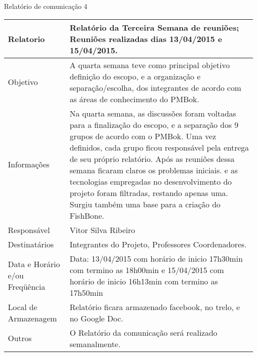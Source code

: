 \documentclass[12pt,openright,oneside,a4paper,brazil]{abntex2}
\begin{document}
\begin{center}
{\large Relatório de comunicação 4}
\begin{table}[h]
\begin{tabular}{|p{6cm}|p{9cm}|}\hline
Relatorio & Relatório da Terceira Semana de reuniões; Reuniões realizadas dias 13/04/2015 e 15/04/2015.\\ \hline
Objetivo & A quarta semana teve como principal objetivo definição do escopo, e a organização e separação/escolha, dos integrantes de acordo com as áreas de conhecimento do PMBok.\\ \hline
Informações & Na quarta semana, as discussões foram voltadas para a finalização do escopo, e a separação dos 9 grupos de acordo com o PMBok. Uma vez definidos, cada grupo ficou responsável pela entrega de seu próprio relatório.
Após as reuniões dessa semana ficaram claros os problemas iniciais. e as tecnologias empregadas no desenvolvimento do projeto foram filtradas, restando apenas uma.
Surgiu também uma base para a criação do FishBone.\\ \hline
Responsável & Vitor Silva Ribeiro\\ \hline
Destinatários & Integrantes do Projeto, Professores Coordenadores.\\ \hline
Data e Horário e/ou Freqüência & Data: 13/04/2015 com horário de inicio 17h30min com termino as 18h00min e 15/04/2015 com horário de inicio 16h13min com  termino as 17h50min\\ \hline
Local de Armazenagem & Relatório ficara armazenado facebook, no trelo, e no Google Doc.\\ \hline
Outros & O Relatório da comunicação será realizado semanalmente.\\ \hline
\end{tabular}
\end{table}

\end{center}
\end{document}
